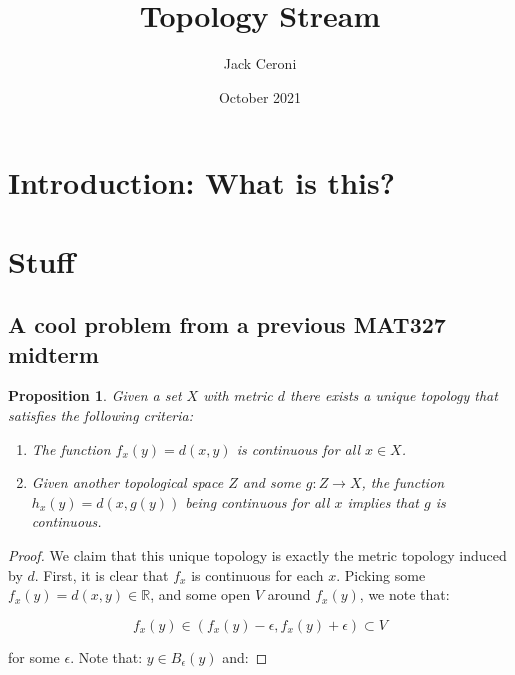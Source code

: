 \documentclass[10pt, oneside]{amsart}
\title{Topology Stream}
\author{Jack Ceroni}
\date{October 2021}
\newtheorem{prop}{Proposition}
\begin{document}
    \maketitle

    \tableofcontents

    \vspace{.25in}

    \newpage

    \section{Introduction: What is this?}

    \section{Stuff}

    \subsection{A cool problem from a previous MAT327 midterm}

    \begin{prop}
      Given a set $X$ with metric $d$ there exists a unique topology that satisfies the following criteria:

      \begin{enumerate}
      \item The function $f_x(y) = d(x, y)$ is continuous for all $x \in X$.
      \item Given another topological space $Z$ and some $g : Z \rightarrow X$, the function $h_x(y) = d(x, g(y))$ being continuous for all $x$ implies that
        $g$ is continuous.
        \end{enumerate}
    \end{prop}

    \begin{proof}
      We claim that this unique topology is exactly the metric topology induced by $d$. First, it is clear that $f_x$ is continuous for each $x$. Picking some
      $f_x(y) = d(x, y) \in \mathbb{R}$, and some open $V$ around $f_x(y)$, we note that:

      $$f_x(y) \in (f_x(y) - \epsilon, f_x(y) + \epsilon) \subset V$$

      for some $\epsilon$. Note that: $y \in B_{\epsilon}(y)$ and:
      \end{proof}

    
\end{document}
